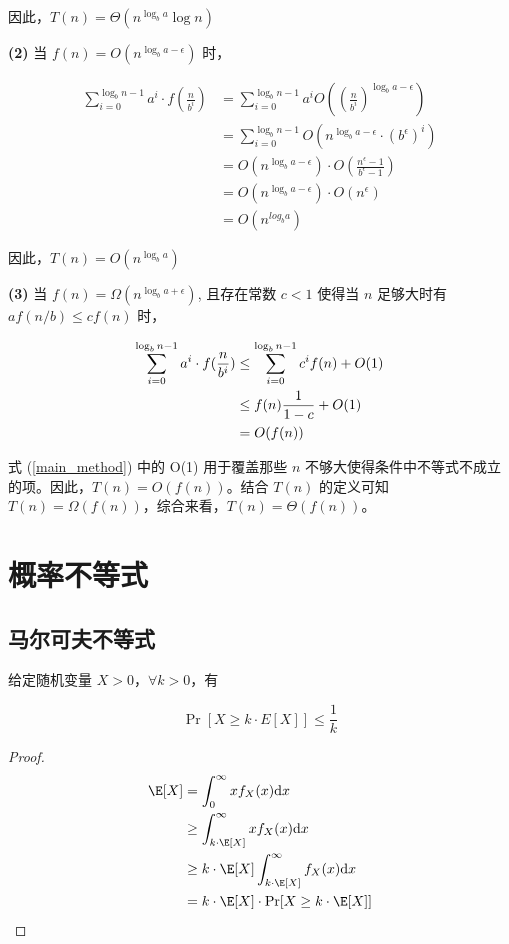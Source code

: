 \documentclass[lang=cn,newtx,10pt,scheme=chinese,chinesefont=nofont,citestyle=gb7714-2015, bibstyle=gb7714-2015]{elegantbook}
\begin{document}
\begin{refsection}
\begin{solution}
因此，$T(n) = \Theta(n^{\log_b a}\log n)$

\noindent\textbf{(2)} 当 $f(n) = O(n^{\log_b a-\epsilon})$ 时，

\begin{align*}
    \sum_{i=0}^{\log_b n-1}a^i\cdot f(\frac{n}{b^i}) &= \sum_{i=0}^{\log_b n-1}a^i O((\frac{n}{b^i})^{\log_b a-\epsilon}) \\
    &= \sum_{i=0}^{\log_b n-1}O(n^{\log_b a-\epsilon}\cdot (b^\epsilon)^i) \\
    &= O(n^{\log_b a-\epsilon})\cdot O(\frac{n^\epsilon-1}{b^\epsilon-1}) \\
    &= O(n^{\log_b a-\epsilon})\cdot O(n^\epsilon) \\
    &= O(n^{log_b a})
\end{align*}

因此，$T(n) = O(n^{\log_b a})$

\noindent\textbf{(3)} 当 $f(n) = \Omega(n^{\log_b a+\epsilon})$, 且存在常数 $c<1$ 使得当 $n$ 足够大时有 $af(n/b)\le cf(n)$ 时，

\begin{align}
    \sum_{i=0}^{\log_b n-1}a^i\cdot f(\frac{n}{b^i}) &\le \sum_{i=0}^{\log_b n-1} c^i f(n) + O(1) \label{main_method} \\
    &\le f(n) \frac{1}{1-c} + O(1) \notag \\
    &= O(f(n)) \notag
\end{align}

式 (\ref{main_method}) 中的 O(1) 用于覆盖那些 $n$ 不够大使得条件中不等式不成立的项。因此，$T(n)=O(f(n))$。结合 $T(n)$ 的定义可知 $T(n)=\Omega(f(n))$，综合来看，$T(n)=\Theta(f(n))$。
\end{solution}
\section{概率不等式}
\subsection{马尔可夫不等式}
\begin{theorem}
给定随机变量 $X>0$，$\forall k>0$，有

\begin{equation*}
    \Pr[X\ge k\cdot E[X]] \le \frac{1}{k}
\end{equation*}
\end{theorem}

\begin{proof}
\begin{align*}
    \E[X] &= \int_0^{\infty}xf_X(x)\mathrm{d}x \\
    &\ge \int_{k\cdot\E[X]}^{\infty}xf_X(x)\mathrm{d}x \\
    &\ge k\cdot \E[X]\int_{k\cdot\E[X]}^{\infty}f_X(x)\mathrm{d}x \\
    &= k\cdot \E[X]\cdot \Pr[X\ge k\cdot \E[X]]
\end{align*}
\end{proof}


\end{refsection}
\end{document}
